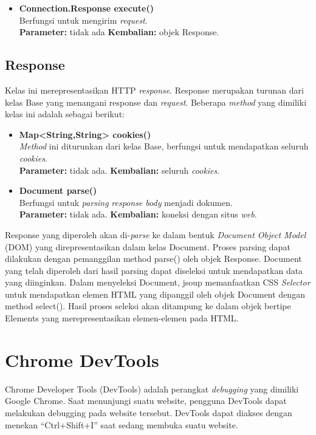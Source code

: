 \begin{itemize}
		\item \textbf{Connection.Response execute()} \\
		Berfungsi untuk mengirim \textit{request}.\\
		\textbf{Parameter:} tidak ada
		\textbf{Kembalian:} objek Response.	
\end{itemize}

\subsection{Response}

Kelas ini merepresentasikan HTTP \textit{response}. Response merupakan turunan dari kelas Base yang menangani response dan \textit{request}. Beberapa \textit{method} yang dimiliki kelas ini adalah sebagai berikut:
\begin{itemize}
	\item \textbf{Map<String,String> cookies()} \\
		\textit{Method} ini diturunkan dari kelas Base, berfungsi untuk mendapatkan seluruh \textit{cookies}. \\
		\textbf{Parameter:} tidak ada.
		\textbf{Kembalian:} seluruh \textit{cookies}.
		
		\item \textbf{Document parse()} \\
		Berfungsi untuk \textit{parsing} \textit{response body} menjadi dokumen. \\
		\textbf{Parameter:} tidak ada.
		\textbf{Kembalian:} koneksi dengan situs \textit{web}.
\end{itemize}


Response yang diperoleh akan di-\textit{parse} ke dalam bentuk \textit{Document Object Model} (DOM) yang direpresentasikan dalam kelas Document. Proses parsing dapat dilakukan dengan pemanggilan method parse() oleh objek Response. Document yang telah diperoleh dari hasil parsing dapat diseleksi untuk mendapatkan data yang diinginkan. Dalam menyeleksi Document, jsoup memanfaatkan CSS \textit{Selector} untuk mendapatkan elemen HTML yang dipanggil oleh objek Document dengan method select(). Hasil proses seleksi akan ditampung ke dalam objek bertipe Elements yang merepresentasikan elemen-elemen pada HTML. 

\section{Chrome DevTools}
\label{sec:devtools}

Chrome Developer Tools (DevTools) \cite{devtools} adalah perangkat \textit{debugging} yang dimiliki Google Chrome. Saat menunjungi suatu website, pengguna DevTools dapat melakukan debugging pada website tersebut. DevTools dapat diakses dengan menekan "`Ctrl+Shift+I"' saat sedang membuka suatu website.  

